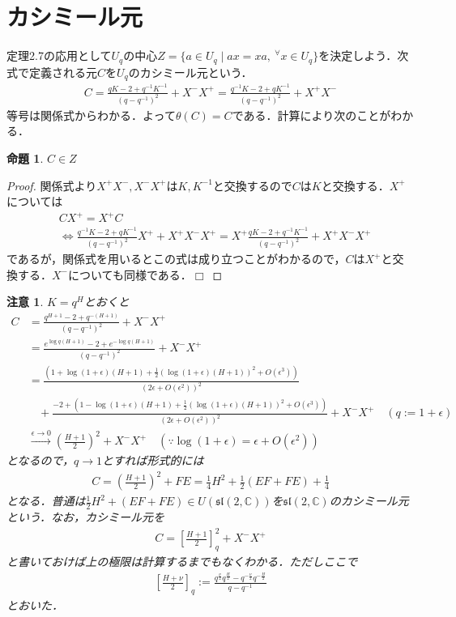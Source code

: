\documentclass[dvipdfmx]{jsarticle}
\newtheorem{prop}{命題}[section]
\newtheorem{proof}{証明}
\def\qed{\hfill $\Box$}
\newtheorem{attention}{注意}
\begin{document}
\section*{カシミール元}
定理2.7の応用として$U_q$の中心$Z=\{a\in U_q\mid ax=xa,{\ } ^\forall x\in U_q\}$を決定しよう．次式で定義される元$C$を$U_q$のカシミール元という．
\begin{align*}
C=\frac{qK-2+q^{-1}K^{-1}}{(q-q^{-1})^2}+X^-X^+=\frac{q^{-1}K-2+qK^{-1}}{(q-q^{-1})^2}+X^+X^-
\end{align*}
等号は関係式からわかる．よって$\theta(C)=C$である．計算により次のことがわかる．
\setcounter{prop}{8}
\begin{prop}
$C\in Z$
\end{prop}
\begin{proof}
関係式より$X^+X^-,X^-X^+$は$K,K^{-1}$と交換するので$C$は$K$と交換する．$X^+$については
\begin{align*}
&CX^+=X^+C \\
&\Longleftrightarrow \frac{q^{-1}K-2+qK^{-1}}{(q-q^{-1})^2}X^++X^+X^-X^+=X^+\frac{qK-2+q^{-1}K^{-1}}{(q-q^{-1})^2}+X^+X^-X^+
\end{align*}
であるが，関係式を用いるとこの式は成り立つことがわかるので，$C$は$X^+$と交換する．$X^-$についても同様である．\qed
\end{proof}
%
%
%
\begin{attention}
$K=q^H$とおくと
\begin{align*}
C
&=\frac{q^{H+1}-2+q^{-(H+1)}}{(q-q^{-1})^2}+X^-X^+ \\
&=\frac{e^{\log{q}(H+1)}-2+e^{-\log{q}(H+1)}}{(q-q^{-1})^2}+X^-X^+ \\
&=\frac{\left(1+\log{(1+\epsilon)}(H+1)+\frac{1}{2}\left(\log{(1+\epsilon)}(H+1)\right)^2+O(\epsilon^3)\right)}{(2\epsilon+O(\epsilon^2))^2} \\
&{\ }{\ }{\ }{\ }+\frac{-2+\left(1-\log{(1+\epsilon)}(H+1)+\frac{1}{2}\left(\log{(1+\epsilon)}(H+1)\right)^2+O(\epsilon^3)\right)}{(2\epsilon+O(\epsilon^2))^2}+X^-X^+ \quad (q:=1+\epsilon) \\
&\overset{\epsilon\to 0}{\to} \left(\frac{H+1}{2}\right)^2+X^-X^+ \quad (\because \log{(1+\epsilon)}=\epsilon+O(\epsilon^2))
\end{align*}
となるので，$q\to 1$とすれば形式的には
\begin{align*}
C=\left(\frac{H+1}{2}\right)^2+FE=\frac{1}{4}H^2+\frac{1}{2}(EF+FE)+\frac{1}{4}
\end{align*}
となる．普通は$\frac{1}{2}H^2+(EF+FE)\in U(\mathfrak{sl}(2,\mathbb{C}))$を$\mathfrak{sl}(2,\mathbb{C})$のカシミール元という．なお，カシミール元を
\begin{align*}
C=\left[\frac{H+1}{2}\right]_q^2+X^-X^+
\end{align*}
と書いておけば上の極限は計算するまでもなくわかる．ただしここで
\begin{align*}
\left[\frac{H+\nu}{2}\right]_q:=\frac{q^{\frac{\nu}{2}}q^{\frac{H}{2}}-q^{-\frac{\nu}{2}}q^{-\frac{H}{2}}}{q-q^{-1}}
\end{align*}
とおいた．
\end{attention}
\end{document}
